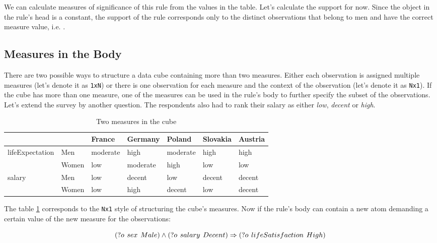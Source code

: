 We can calculate measures of significance of this rule from the values in the table. Let's calculate the support for now. Since the object in the rule's head is a constant, the support of the rule corresponds only to the distinct observations that belong to men and have the correct measure value, i.e. . 

\subsection{Measures in the Body}

There are two possible ways to structure a data cube containing more than two measures. Either each observation is assigned multiple measures (let's denote it as \verb|1xN|) or there is one observation for each measure and the context of the observation (let's denote it as \verb|Nx1|). If the cube has more than one measure, one of the measures can be used in the rule's body to further specify the subset of the observations. Let's extend the survey by another question. The respondents also had to rank their salary as either \textit{low}, \textit{decent} or \textit{high}.

\begin{table}[h]
\centering
\begin{tabular}{ll|lllll}
                                 &       & France   & Germany  & Poland   & Slovakia & Austria  \\ 
\hline
\multirow{2}{*}{lifeExpectation} & Men   & moderate & high     & moderate & high     & high     \\
                                     & Women & low      & moderate & high     & low      & low      \\ 
\hline
\multirow{2}{*}{salary}          & Men   & low      & decent   & low      & decent   & decent     \\
                                     & Women & low      & high     & decent   & low      & decent  
\end{tabular}
\caption{Two measures in the cube}\label{table2}
\end{table}

The table \ref{table2} corresponds to the \verb|Nx1| style of structuring the cube's measures. Now if the rule's body can contain a new atom demanding a certain value of the new measure for the observations:

\begin{equation}\label{rule2}
(?o\hspace{0.4em}sex\hspace{0.4em}Male) \land (?o\hspace{0.4em}salary\hspace{0.4em}Decent)  \Rightarrow (?o\hspace{0.4em}lifeSatisfaction\hspace{0.4em}High) 
\end{equation}

